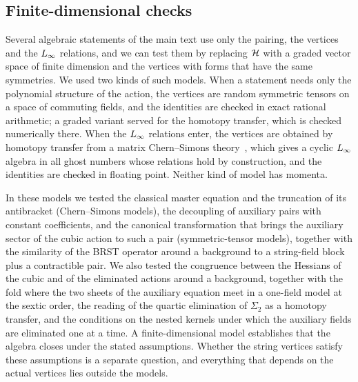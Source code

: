 \subsection{Finite-dimensional checks}
\label{p:app:finite-models}


  Several algebraic statements of the main text use only the pairing, the vertices and the $L_\infty$ relations, and we can test them by replacing $\mathcal{H}$ with a graded vector space of finite dimension and the vertices with forms that have the same symmetries.
  We used two kinds of such models.
  When a statement needs only the polynomial structure of the action, the vertices are random symmetric tensors on a space of commuting fields, and the identities are checked in exact rational arithmetic; a graded variant served for the homotopy transfer, which is checked numerically there.
  When the $L_\infty$ relations enter, the vertices are obtained by homotopy transfer from a matrix Chern--Simons theory~\cite{Kajiura:2007:NoncommutativeHomotopyAlgebras}, which gives a cyclic $L_\infty$ algebra in all ghost numbers whose relations hold by construction, and the identities are checked in floating point.
  Neither kind of model has momenta.

  In these models we tested the classical master equation and the truncation of its antibracket (Chern--Simons models), the decoupling of auxiliary pairs with constant coefficients, and the canonical transformation that brings the auxiliary sector of the cubic action to such a pair (symmetric-tensor models), together with the similarity of the BRST operator around a background to a string-field block plus a contractible pair.
  We also tested the congruence between the Hessians of the cubic and of the eliminated actions around a background, together with the fold where the two sheets of the auxiliary equation meet in a one-field model at the sextic order, the reading of the quartic elimination of $\Sigma_2$ as a homotopy transfer, and the conditions on the nested kernels under which the auxiliary fields are eliminated one at a time.
  A finite-dimensional model establishes that the algebra closes under the stated assumptions.
  Whether the string vertices satisfy these assumptions is a separate question, and everything that depends on the actual vertices lies outside the models.


